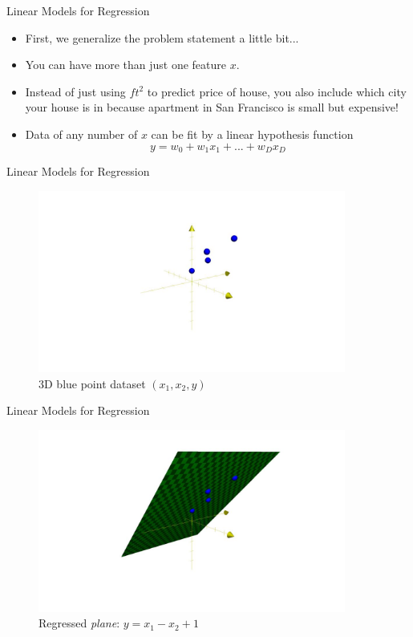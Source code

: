 \begin{frame}{Linear Models for Regression}
\begin{itemize}
    \item First, we generalize the problem statement a little bit...
    \item You can have more than just one feature $x$.
    \item Instead of just using $ft^2$ to predict price of house, you also include which city your house is in because apartment in San Francisco is small but expensive!
    \item Data of any number of $x$ can be fit by a linear hypothesis function 
    $$y = w_0 + w_1x_1 + ... + w_Dx_D$$
\end{itemize}
\end{frame}

\begin{frame}{Linear Models for Regression}
\begin{figure}
    \centering
    \includegraphics[width=0.9\textwidth]{img/3d_regressed_points.jpg}
    \caption{3D blue point dataset $(x_1, x_2, y)$}
\end{figure}
\end{frame}

\begin{frame}{Linear Models for Regression}
\begin{figure}
    \centering
    \includegraphics[width=0.9\textwidth]{img/3d_regressed_line.jpg}
    \caption{Regressed \textit{plane}: $y= x_1 - x_2 +1$}
\end{figure}
\end{frame}

